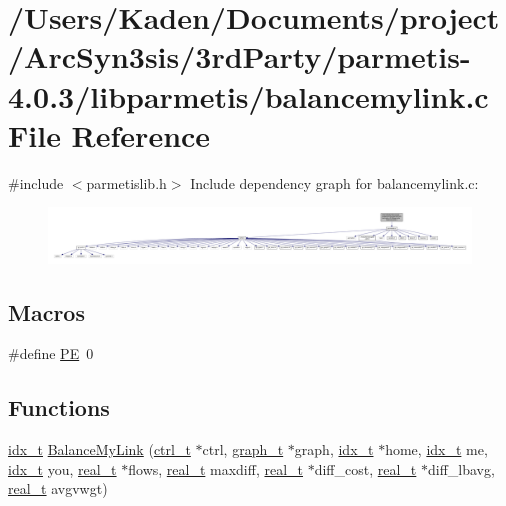 \hypertarget{a00341}{}\section{/\+Users/\+Kaden/\+Documents/project/\+Arc\+Syn3sis/3rd\+Party/parmetis-\/4.0.3/libparmetis/balancemylink.c File Reference}
\label{a00341}
{\ttfamily \#include $<$parmetislib.\+h$>$}\newline
Include dependency graph for balancemylink.\+c\+:\nopagebreak
\begin{figure}[H]
\begin{center}
\leavevmode
\includegraphics[width=350pt]{a00342}
\end{center}
\end{figure}
\subsection*{Macros}
\begin{DoxyCompactItemize}
\item 
\#define \hyperlink{a00341_a211238ffe3627f42ca7b04bc96cc8fa6}{PE}~0
\end{DoxyCompactItemize}
\subsection*{Functions}
\begin{DoxyCompactItemize}
\item 
\hyperlink{a00876_aaa5262be3e700770163401acb0150f52}{idx\+\_\+t} \hyperlink{a00341_a0c95cce46bb5d58661489c076a876018}{Balance\+My\+Link} (\hyperlink{a00742}{ctrl\+\_\+t} $\ast$ctrl, \hyperlink{a00734}{graph\+\_\+t} $\ast$graph, \hyperlink{a00876_aaa5262be3e700770163401acb0150f52}{idx\+\_\+t} $\ast$home, \hyperlink{a00876_aaa5262be3e700770163401acb0150f52}{idx\+\_\+t} me, \hyperlink{a00876_aaa5262be3e700770163401acb0150f52}{idx\+\_\+t} you, \hyperlink{a00876_a1924a4f6907cc3833213aba1f07fcbe9}{real\+\_\+t} $\ast$flows, \hyperlink{a00876_a1924a4f6907cc3833213aba1f07fcbe9}{real\+\_\+t} maxdiff, \hyperlink{a00876_a1924a4f6907cc3833213aba1f07fcbe9}{real\+\_\+t} $\ast$diff\+\_\+cost, \hyperlink{a00876_a1924a4f6907cc3833213aba1f07fcbe9}{real\+\_\+t} $\ast$diff\+\_\+lbavg, \hyperlink{a00876_a1924a4f6907cc3833213aba1f07fcbe9}{real\+\_\+t} avgvwgt)
\end{DoxyCompactItemize}


